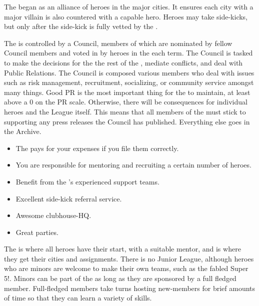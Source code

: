 \documentclass[blue]{LRSguildcamp1}
\begin{document}
\name{\bHeroLeague{}}


The \cHeroLeague{\intro} began as an alliance of heroes in the major cities. It ensures each city with a major villain is also countered with a capable hero. Heroes may take side-kicks, but only after the side-kick is fully vetted by the \cHeroLeague{}. 

The \cHeroLeague{} is controlled by a Council, members of which are nominated by fellow Council members and voted in by heroes in the \cHeroLeague{} each term. The Council is tasked to make the decisions for the the rest of the \cHeroLeague{}, mediate conflicts, and deal with Public Relations. The Council is composed various members who deal with issues such as risk management, recruitment, socializing, or community service amongst many things. Good PR is the most important thing for the \cHeroLeague{} to maintain, at least above a 0 on the PR scale. Otherwise, there will be consequences for individual heroes and the League itself. This means that all members of the \cHeroLeague{} must stick to supporting any press releases the Council has published. Everything else goes in the \cHeroLeague{} Archive.

\begin{itemize}
\item The \cHeroLeague{} pays for your expenses if you file them correctly. 
\item You are responsible for mentoring and recruiting a certain number of heroes.
\item Benefit from the \cHeroLeague{}'s experienced support teams.
\item Excellent side-kick referral service. 
\item Awesome clubhouse-HQ.
\item Great parties.
\end{itemize}

The \cHeroLeague{} is where all heroes have their start, with a suitable mentor, and is where they get their cities and assignments. There is no Junior League, although heroes who are minors are welcome to make their own teams, such as the fabled Super 5!.  Minors can be part of the \cHeroLeague{} as long as they are sponsored by a full fledged member. Full-fledged members take turns hosting new-members for brief amounts of time so that they can learn a variety of skills. 
\end{document}
